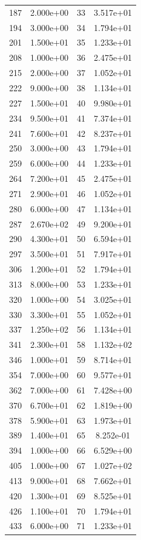 \documentclass[12pt]{article}
\begin{document}
\begin{longtable}{@{}cccc@{}}
187 & 2.000e+00 & 33 & 3.517e+01 \\
194 & 3.000e+00 & 34 & 1.794e+01 \\
201 & 1.500e+01 & 35 & 1.233e+01 \\
208 & 1.000e+00 & 36 & 2.475e+01 \\
215 & 2.000e+00 & 37 & 1.052e+01 \\
222 & 9.000e+00 & 38 & 1.134e+01 \\
227 & 1.500e+01 & 40 & 9.980e+01 \\
234 & 9.500e+01 & 41 & 7.374e+01 \\
241 & 7.600e+01 & 42 & 8.237e+01 \\
250 & 3.000e+00 & 43 & 1.794e+01 \\
259 & 6.000e+00 & 44 & 1.233e+01 \\
264 & 7.200e+01 & 45 & 2.475e+01 \\
271 & 2.900e+01 & 46 & 1.052e+01 \\
280 & 6.000e+00 & 47 & 1.134e+01 \\
287 & 2.670e+02 & 49 & 9.200e+01 \\
290 & 4.300e+01 & 50 & 6.594e+01 \\
297 & 3.500e+01 & 51 & 7.917e+01 \\
306 & 1.200e+01 & 52 & 1.794e+01 \\
313 & 8.000e+00 & 53 & 1.233e+01 \\
320 & 1.000e+00 & 54 & 3.025e+01 \\
330 & 3.300e+01 & 55 & 1.052e+01 \\
337 & 1.250e+02 & 56 & 1.134e+01 \\
341 & 2.300e+01 & 58 & 1.132e+02 \\
346 & 1.000e+01 & 59 & 8.714e+01 \\
354 & 7.000e+00 & 60 & 9.577e+01 \\
362 & 7.000e+00 & 61 & 7.428e+00 \\
370 & 6.700e+01 & 62 & 1.819e+00 \\
378 & 5.900e+01 & 63 & 1.973e+01 \\
389 & 1.400e+01 & 65 & 8.252e-01 \\
394 & 1.000e+00 & 66 & 6.529e+00 \\
405 & 1.000e+00 & 67 & 1.027e+02 \\
413 & 9.000e+01 & 68 & 7.662e+01 \\
420 & 1.300e+01 & 69 & 8.525e+01 \\
426 & 1.100e+01 & 70 & 1.794e+01 \\
433 & 6.000e+00 & 71 & 1.233e+01 \\

\end{longtable}
\end{document}
